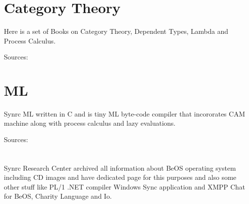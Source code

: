 \documentclass[11pt]{article}
\begin{document}
\section*{Category Theory}
\paragraph{}
Here is a set of Books on Category Theory, Dependent Types, Lambda and Process Calculus.

Sources: 

\section*{ML}
\paragraph{}
Synrc ML written in C and is tiny ML byte-code compiler that incororates CAM machine
along with process calculus and lazy evaluations.

Sources: 

\section*{}
\paragraph{}
Synrc Research Center archived all information about BeOS operating system 
including CD images and have dedicated page for this purposes and also some
other stuff like PL/1 .NET compiler Windows Sync application and XMPP Chat for BeOS, Charity Language and Io.





\end{document}

